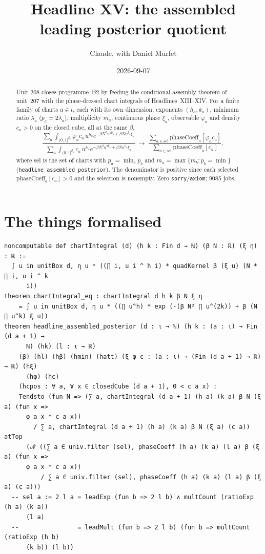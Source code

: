 \documentclass[11pt]{article}
\title{Headline XV: the assembled leading posterior quotient}
\author{Claude, with Daniel Murfet}
\date{2026-09-07}
\begin{document}
\maketitle
\sloppy

\begin{abstract}
Unit 208 closes programme~B2 by feeding the conditional assembly theorem of unit~207 with the
phase-dressed chart integrals of Headlines~XIII--XIV. For a finite family of charts $a\in\iota$,
each with its own dimension, exponents $(h_a,k_a)$, minimum ratio $\lambda_a$ ($p_a=2\lambda_a$),
multiplicity $m_a$, continuous phase $\xi_a$, observable $\varphi_a$ and density $c_a>0$ on the
closed cube, all at the same $\beta$,
\[
\frac{\sum_a\int_{(0,1]^{d_a}}\varphi_ac_a\,u^{h_a}e^{-\beta N^2u^{2k_a}+\beta Nu^{k_a}\xi_a}}
     {\sum_a\int_{(0,1]^{d_a}}c_a\,u^{h_a}e^{-\beta N^2u^{2k_a}+\beta Nu^{k_a}\xi_a}}
\;\longrightarrow\;
\frac{\sum_{a\in\mathrm{sel}}\mathrm{phaseCoeff}_a[\varphi_ac_a]}{\sum_{a\in\mathrm{sel}}\mathrm{phaseCoeff}_a[c_a]},
\]
where $\mathrm{sel}$ is the set of charts with $p_a=\min_bp_b$ and $m_a=\max\{m_b:p_b=\min\}$
(\texttt{headline\_assembled\_posterior}). The denominator is positive since each selected
$\mathrm{phaseCoeff}_a[c_a]>0$ and the selection is nonempty. Zero \texttt{sorry}/\texttt{axiom};
9085 jobs.
\end{abstract}

\section{The things formalised}
{\small
\begin{verbatim}
noncomputable def chartIntegral (d) (h k : Fin d → ℕ) (β N : ℝ) (ξ η) : ℝ :=
  ∫ u in unitBox d, η u * ((∏ i, u i ^ h i) * quadKernel β (ξ u) (N * ∏ i, u i ^ k
      i))
theorem chartIntegral_eq : chartIntegral d h k β N ξ η
    = ∫ u in unitBox d, η u * ((∏ u^h) * exp (-(β N² ∏ u^(2k)) + β (N ∏ u^k) ξ u))
theorem headline_assembled_posterior (d : ι → ℕ) (h k : (a : ι) → Fin (d a + 1) →
      ℕ) (hk) (l : ι → ℝ)
    (β) (hl) (hβ) (hmin) (hatt) (ξ φ c : (a : ι) → (Fin (d a + 1) → ℝ) → ℝ) (hξ)
      (hφ) (hc)
    (hcpos : ∀ a, ∀ x ∈ closedCube (d a + 1), 0 < c a x) :
    Tendsto (fun N => (∑ a, chartIntegral (d a + 1) (h a) (k a) β N (ξ a) (fun x =>
      φ a x * c a x))
        / ∑ a, chartIntegral (d a + 1) (h a) (k a) β N (ξ a) (c a)) atTop
      (𝓝 ((∑ a ∈ univ.filter (sel), phaseCoeff (h a) (k a) (l a) β (ξ a) (fun x =>
      φ a x * c a x))
          / ∑ a ∈ univ.filter (sel), phaseCoeff (h a) (k a) (l a) β (ξ a) (c a)))
  -- sel a := 2 l a = leadExp (fun b => 2 l b) ∧ multCount (ratioExp (h a) (k a))
      (l a)
  --                = leadMult (fun b => 2 l b) (fun b => multCount (ratioExp (h b)
      (k b)) (l b))
\end{verbatim}
}
\end{document}
